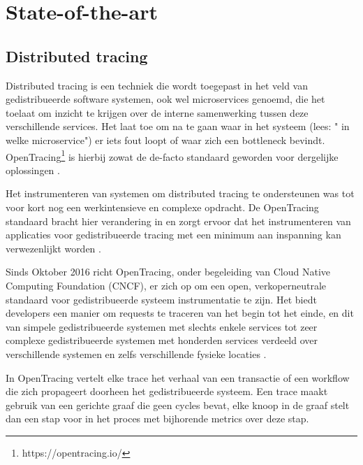 \section{State-of-the-art}
\label{sec:state-of-the-art}

\subsection{Distributed tracing}
Distributed tracing is een techniek die wordt toegepast in het veld van gedistribueerde software systemen, ook wel microservices genoemd, die het toelaat om inzicht te krijgen over de interne samenwerking tussen deze verschillende services. Het laat toe om na te gaan waar in het systeem (lees: " in welke microservice") er iets fout loopt of waar zich een bottleneck bevindt. OpenTracing\footnote{https://opentracing.io/} is hierbij zowat de de-facto standaard geworden voor dergelijke oplossingen \autocite{Sematext2018} \autocite{Jacqueline2018}.

Het instrumenteren van systemen om distributed tracing te ondersteunen was tot voor kort nog een werkintensieve en complexe opdracht. De OpenTracing standaard bracht hier verandering in en zorgt ervoor dat het instrumenteren van applicaties voor gedistribueerde tracing met een minimum aan inspanning kan verwezenlijkt worden \autocite{Gianluca2017}. 

Sinds Oktober 2016 richt OpenTracing, onder begeleiding van Cloud Native Computing Foundation (CNCF), er zich op om een open, verkoperneutrale standaard voor gedistribueerde systeem instrumentatie te zijn. Het biedt developers een manier om requests te traceren van het begin tot het einde, en dit van simpele gedistribueerde systemen met slechts enkele services tot zeer complexe gedistribueerde systemen met honderden services verdeeld over verschillende systemen en zelfs verschillende fysieke locaties \autocite{Gianluca2017}.

In OpenTracing vertelt elke trace het verhaal van een transactie of een workflow die zich propageert doorheen het gedistribueerde systeem. Een trace maakt gebruik van een gerichte graaf die geen cycles bevat, elke knoop in de graaf stelt dan een stap voor in het proces met bijhorende metrics over deze stap. \autocite{Sematext2018}

